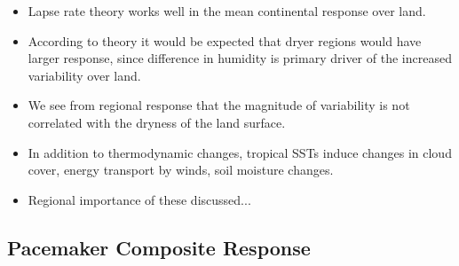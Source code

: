 \begin{itemize}
	\item Lapse rate theory works well in the mean continental response over 
		land.
	\item According to theory it would be expected that dryer regions would have 
		larger response, since difference in humidity is primary driver of the 
		increased variability over land.
	\item We see from regional response that the magnitude of variability is not 
		correlated with the dryness of the land surface.
	\item In addition to thermodynamic changes, tropical SSTs induce changes in 
		cloud cover, energy transport by winds, soil moisture changes.
	\item Regional importance of these discussed...
\end{itemize}

\newpage

\subsection{Pacemaker Composite Response}

